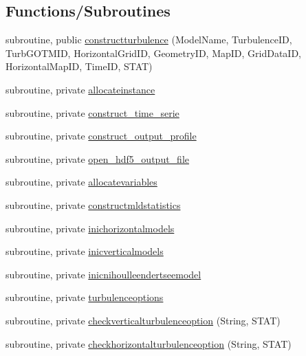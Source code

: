 \subsection*{Functions/\+Subroutines}
\begin{DoxyCompactItemize}
\item 
subroutine, public \mbox{\hyperlink{namespacemoduleturbulence_ace39b4cf089aa70cd60b083a3e341bc9}{constructturbulence}} (Model\+Name, Turbulence\+ID, Turb\+G\+O\+T\+M\+ID, Horizontal\+Grid\+ID, Geometry\+ID, Map\+ID, Grid\+Data\+ID, Horizontal\+Map\+ID, Time\+ID, S\+T\+AT)
\item 
subroutine, private \mbox{\hyperlink{namespacemoduleturbulence_a90657496e68df9748a112f2c597aeda7}{allocateinstance}}
\item 
subroutine, private \mbox{\hyperlink{namespacemoduleturbulence_abb6ebc59b95b0d9ec2ec468d7ab4b43a}{construct\+\_\+time\+\_\+serie}}
\item 
subroutine, private \mbox{\hyperlink{namespacemoduleturbulence_a4e5f190dd7da54cb916c8956e331e54c}{construct\+\_\+output\+\_\+profile}}
\item 
subroutine, private \mbox{\hyperlink{namespacemoduleturbulence_afa8dd99716d657032435779e03fff106}{open\+\_\+hdf5\+\_\+output\+\_\+file}}
\item 
subroutine, private \mbox{\hyperlink{namespacemoduleturbulence_aed366fd3ef93f5aff7c411412fbeb93a}{allocatevariables}}
\item 
subroutine, private \mbox{\hyperlink{namespacemoduleturbulence_a5e493c3242c2ad7a0f5df2178a37aa3b}{constructmldstatistics}}
\item 
subroutine, private \mbox{\hyperlink{namespacemoduleturbulence_a7d9753f3c1a5db2dfb55d80111926a99}{inichorizontalmodels}}
\item 
subroutine, private \mbox{\hyperlink{namespacemoduleturbulence_a676ecd9b2dc8e4fd2506801b206e0fdc}{inicverticalmodels}}
\item 
subroutine, private \mbox{\hyperlink{namespacemoduleturbulence_a59fa0936c4e079b4094b7b50f09a8092}{inicnihoulleendertseemodel}}
\item 
subroutine, private \mbox{\hyperlink{namespacemoduleturbulence_ad051a97467f11a69e59b2a477e516ba9}{turbulenceoptions}}
\item 
subroutine, private \mbox{\hyperlink{namespacemoduleturbulence_ad670a65f522fc5db35f455468f147913}{checkverticalturbulenceoption}} (String, S\+T\+AT)
\item 
subroutine, private \mbox{\hyperlink{namespacemoduleturbulence_a2df9458a1ab29d4f5f3fd747ded725b4}{checkhorizontalturbulenceoption}} (String, S\+T\+AT)

\end{DoxyCompactItemize}
